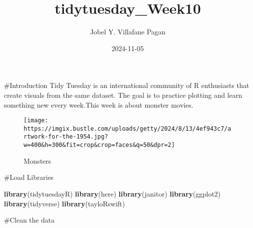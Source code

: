 \documentclass[
]{article}
\title{tidytuesday\_Week10}
\author{Jobel Y. Villafane Pagan}
\date{2024-11-05}
\newenvironment{Shaded}{\begin{snugshade}}{\end{snugshade}}
\newcommand{\FunctionTok}[1]{\textcolor[rgb]{0.13,0.29,0.53}{\textbf{#1}}}
\newcommand{\NormalTok}[1]{#1}
\begin{document}
\maketitle

\#Introduction Tidy Tuesday is an international community of R
enthusiasts that create visuals from the same dataset. The goal is to
practice plotting and learn something new every week.This week is about
monster movies.

\begin{figure}
\centering
\texttt{[image: https://imgix.bustle.com/uploads/getty/2024/8/13/4ef943c7/artwork-for-the-1954.jpg?w=400\&h=300\&fit=crop\&crop=faces\&q=50\&dpr=2]}
\caption{Monsters}
\end{figure}

\#Load Libraries

\begin{Shaded}
\begin{Highlighting}[]
\FunctionTok{library}\NormalTok{(tidytuesdayR)}
\FunctionTok{library}\NormalTok{(here)}
\FunctionTok{library}\NormalTok{(janitor)}
\FunctionTok{library}\NormalTok{(ggplot2)}
\FunctionTok{library}\NormalTok{(tidyverse)}
\FunctionTok{library}\NormalTok{(tayloRswift)}
\end{Highlighting}
\end{Shaded}

\#Clean the data
\end{document}
